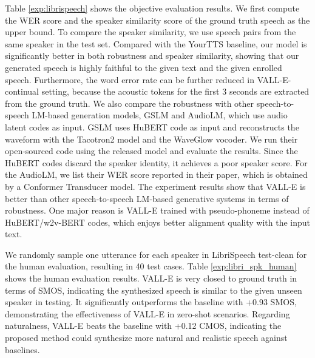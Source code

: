 \documentclass{article}
\theoremstyle{plain}
\theoremstyle{definition}
\theoremstyle{remark}
\newcommand\our{\textsc{VALL-E}}
\begin{document}
Table \ref{exp:librispeech} shows the objective evaluation results. We first compute the WER score and the speaker similarity score of the ground truth speech as the upper bound. To compare the speaker similarity, we use speech pairs from the same speaker in the test set. Compared with the YourTTS baseline, our model is significantly better in both robustness and speaker similarity, showing that our generated speech is highly faithful to the given text and the given enrolled speech. Furthermore, the word error rate can be further reduced in \our{}-continual setting, because the acoustic tokens for the first 3 seconds are extracted from the ground truth.  We also compare the robustness with other speech-to-speech LM-based generation models, GSLM and AudioLM, which use audio latent codes as input. GSLM uses HuBERT code as input and reconstructs the waveform with the Tacotron2 \citep{DBLP:conf/icassp/ShenPWSJYCZWRSA18} model and the WaveGlow \citep{prenger2019waveglow} vocoder. We run their open-sourced code using the released model and evaluate the results. Since the HuBERT codes discard the speaker identity, it achieves a poor speaker score.  For the AudioLM, we list their WER score reported in their paper, which is obtained by a Conformer Transducer model.  The experiment results show that \our{} is better than other speech-to-speech LM-based generative systems in  terms of robustness. One major reason is \our{} trained with pseudo-phoneme instead of HuBERT/w2v-BERT codes, which enjoys better alignment quality with the input text. 



We randomly sample one utterance for each speaker in LibriSpeech test-clean for the human evaluation, resulting in 40 test cases. Table \ref{exp:libri_spk_human} shows the human evaluation results. \our{} is very closed to ground truth in terms of SMOS, indicating the synthesized speech is similar to the given unseen speaker in testing. It significantly outperforms the baseline with +0.93 SMOS, demonstrating the effectiveness of \our{} in zero-shot scenarios. 
Regarding naturalness, \our{} beats the baseline with +0.12 CMOS, indicating the proposed method could synthesize more natural and realistic speech against baselines. 
\end{document}
